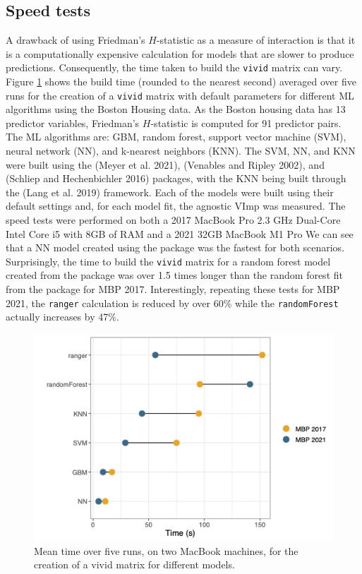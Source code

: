 \hypertarget{sec:speed}{%
\subsection{Speed tests}\label{sec:speed}}

A drawback of using Friedman's \(H\)-statistic as a measure of interaction is that it is a computationally expensive calculation for models that are slower to produce predictions. Consequently, the time taken to build the \texttt{vivid} matrix can vary.
Figure \ref{fig:speedtest}
shows the build time (rounded to the nearest second) averaged over five runs for the creation of a \texttt{vivid} matrix with default parameters for different ML algorithms using the Boston Housing data. As the Boston housing data has 13 predictor variables, Friedman's \(H\)-statistic is computed for 91 predictor pairs. The ML algorithms are: GBM, random forest, support vector machine (SVM), neural network (NN), and k-nearest neighbors (KNN). The SVM, NN, and KNN were built using the  (Meyer et al. 2021),  (Venables and Ripley 2002), and  (Schliep and Hechenbichler 2016) packages, with the KNN being built through the  (Lang et al. 2019) framework. Each of the models were built using their default settings and, for each model fit, the agnostic VImp was measured. The speed tests were performed on both a 2017 MacBook Pro 2.3 GHz Dual-Core Intel Core i5 with 8GB of RAM and a 2021 32GB MacBook M1 Pro We can see that a NN model created using the  package was the fastest for both scenarios. Surprisingly, the time to build the \texttt{vivid} matrix for a random forest model created from the  package was over 1.5 times longer than the random forest fit from the  package for MBP 2017. Interestingly, repeating these tests for MBP 2021, the \texttt{ranger} calculation is reduced by over 60\% while the \texttt{randomForest} actually increases by 47\%.

\begin{figure}

{\centering \includegraphics[width=0.6\linewidth]{speedTestsplot} 

}

\caption{Mean time over five runs, on two MacBook machines, for the creation of a vivid matrix for different models.}\label{fig:speedtest}
\end{figure}

